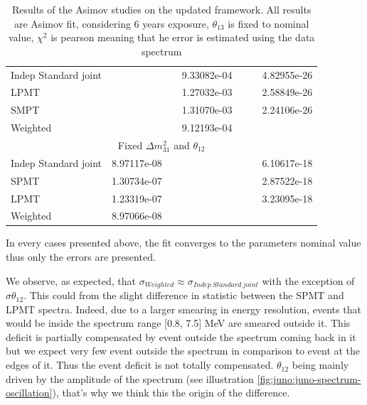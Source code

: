 \documentclass[../main.tex]{subfiles}
\begin{document}
\begin{table}[ht]
\begin{footnotesize}
\begin{tabular}{l | c | c | c | c | c | c }
  \hline
  Indep Standard joint &               &               & 9.33082e-04   &               &               & 4.82955e-26 \\
  LPMT                 &               &               & 1.27032e-03   &               &               & 2.58849e-26 \\
  SMPT                 &               &               & 1.31070e-03   &               &               & 2.24106e-26 \\
  Weighted             &               &               & 9.12193e-04   &               &               & \\
  \hline
  \hline
  \multicolumn{7}{c}{Fixed $\Delta m^2_{31}$ and $\theta_{12}$} \\
  \hline
  Indep Standard joint          & 8.97117e-08   &               &               &               &               & 6.10617e-18 \\
  SPMT                          & 1.30734e-07   &               &               &               &               & 2.87522e-18 \\
  LPMT                          & 1.23319e-07   &               &               &               &               & 3.23095e-18 \\
  Weighted                      & 8.97066e-08   &               &               &               &               & \\
  \end{tabular}
  \end{footnotesize}
  \caption{Results of the Asimov studies on the updated framework. All results are Asimov fit, considering 6 years exposure, $\theta_{13}$ is fixed to nominal value, $\chi^2$ is pearson meaning that he error is estimated using the data spectrum}
  \label{tab:joint_fit:asimov_results}

\end{table}

In every cases presented above, the fit converges to the parameters nominal value thus only the errors are presented.

We observe, as expected, that $\sigma_{Weighted} \approx \sigma_{Indep~Standard~joint}$ with the exception of $\sigma \theta_{12}$. This could from the slight difference in statistic between the SPMT and LPMT spectra. Indeed, due to a larger smearing in energy resolution, events that would be inside the spectrum range [0.8, 7.5] MeV are smeared outside it. This deficit is partially compensated by event outside the spectrum coming back in it but we expect very few event outside the spectrum in comparison to event at the edges of it. Thus the event deficit is not totally compensated. $\theta_{12}$ being mainly driven by the amplitude of the spectrum (see illustration \ref{fig:juno:juno-spectrum-oscillation}), that's why we think this the origin of the difference.
\end{document}
